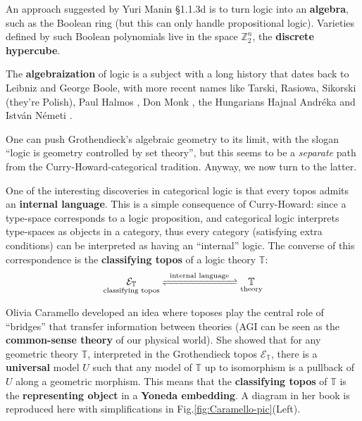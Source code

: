 \documentclass[runningheads]{llncs}
\begin{document}
An approach suggested by Yuri Manin \cite{Manin2009} \cite{Manin2018} \S1.1.3d is to turn logic into an \textbf{algebra}, such as the Boolean ring (but this can only handle propositional logic).  Varieties defined by such Boolean polynomials \cite{Lundqvist2015} live in the space $\mathbb{Z}_2^n$, the \textbf{discrete hypercube}.  

The \textbf{algebraization} of logic is a subject with a long history that dates back to Leibniz and George Boole, with more recent names like Tarski, Rasiowa, Sikorski (they're Polish), Paul Halmos \cite{Halmos1962} \cite{Halmos1998}, Don Monk \cite{Monk1971}, the Hungarians Hajnal Andr\'{e}ka and Istv\'{a}n N\'{e}meti \cite{Andreka1991} \cite{Andreka2021}.  

One can push Grothendieck's algebraic geometry to its limit, with the slogan ``logic is geometry controlled by set theory'', but this seems to be a \textit{separate} path from the Curry-Howard-categorical tradition.  Anyway, we now turn to the latter.


One of the interesting discoveries in categorical logic is that every topos admits an \textbf{internal language}.  This is a simple consequence of Curry-Howard: since a type-space corresponds to a logic proposition, and categorical logic interprets type-spaces as objects in a category, thus every category (satisfying extra conditions) can be interpreted as having an ``internal'' logic.  The converse of this correspondence is the \textbf{classifying topos} of a logic theory $\mathbb{T}$:
\begin{equation}
\underset{\footnotesize\text{classifying topos}}{\mathcal{E}_\mathbb{T}} \xrightleftharpoons[]{\; \text{ internal language } \;} \underset{\footnotesize\text{theory}}{\mathbb{T}}
\end{equation}

Olivia Caramello \cite{Caramello2018} developed an idea where toposes play the central role of ``bridges'' that transfer information between theories (AGI can be seen as the \textbf{common-sense theory} of our physical world).  She showed that for any geometric theory $\mathbb{T}$, interpreted in the Grothendieck topos $\mathcal{E}_\mathbb{T}$, there is a \textbf{universal} model $U$ such that any model of $\mathbb{T}$ up to isomorphism is a pullback of $U$ along a geometric morphism.  This means that the \textbf{classifying topos} of $\mathbb{T}$ is the \textbf{representing object} in a \textbf{Yoneda embedding}.  A diagram in her book is reproduced here with simplifications in Fig.\ref{fig:Caramello-pic}(Left).
\end{document}
